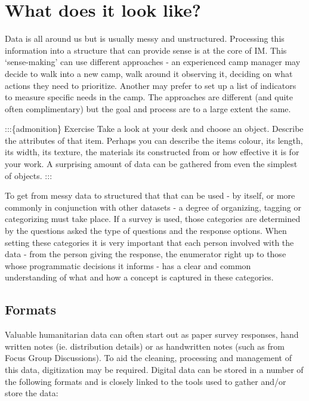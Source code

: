 \documentclass[
  a4paper,
  onecolumn,
  oneside]{book}
\begin{document}
\hypertarget{what-does-it-look-like}{%
\section{What does it look like?}\label{what-does-it-look-like}}

Data is all around us but is usually messy and unstructured. Processing
this information into a structure that can provide sense is at the core
of IM. This `sense-making' can use different approaches - an experienced
camp manager may decide to walk into a new camp, walk around it
observing it, deciding on what actions they need to prioritize. Another
may prefer to set up a list of indicators to measure specific needs in
the camp. The approaches are different (and quite often complimentary)
but the goal and process are to a large extent the same.

:::\{admonition\} Exercise Take a look at your desk and choose an
object. Describe the attributes of that item. Perhaps you can describe
the items colour, its length, its width, its texture, the materials its
constructed from or how effective it is for your work. A surprising
amount of data can be gathered from even the simplest of objects. :::

To get from messy data to structured that that can be used - by itself,
or more commonly in conjunction with other datasets - a degree of
organizing, tagging or categorizing must take place. If a survey is
used, those categories are determined by the questions asked the type of
questions and the response options. When setting these categories it is
very important that each person involved with the data - from the person
giving the response, the enumerator right up to those whose programmatic
decisions it informs - has a clear and common understanding of what and
how a concept is captured in these categories.

\hypertarget{formats}{%
\subsection{Formats}\label{formats}}

Valuable humanitarian data can often start out as paper survey
responses, hand written notes (ie. distribution details) or as
handwritten notes (such as from Focus Group Discussions). To aid the
cleaning, processing and management of this data, digitization may be
required. Digital data can be stored in a number of the following
formats and is closely linked to the tools used to gather and/or store
the data:
\end{document}

